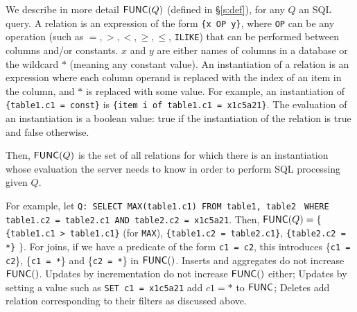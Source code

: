\appendix

We describe in more detail $\mathsf{FUNC}(Q)$ (defined in \S\ref{s:def}), for any $Q$
an SQL query. A relation is an expression of the form \texttt{\{x OP y\}}, where \texttt{OP} can be any
operation (such as $=, >, <, \ge, \le$, \texttt{ILIKE}) that can be performed
between columns and/or constants. $x$ and $y$ are either names of columns in
a database or the wildcard $*$ (meaning any constant value). An instantiation of a relation is an expression where each column operand is
replaced with the index of an item in the column, and $*$ is
replaced with some value. For example, an instantiation of \texttt{\{table1.c1 =
const\}} is \texttt{\{item i of table1.c1 = x1c5a21\}}. The evaluation of an
instantiation is a boolean value: true if the instantiation of the relation is
true and false otherwise.

Then, $\mathsf{FUNC}(Q)$ is the set of all relations for which there is an instantiation
whose evaluation the server needs to know in order to perform SQL processing
given $Q$.

For example, let \texttt{Q: SELECT MAX(table1.c1) FROM table1, table2} \texttt{
WHERE table1.c2 = table2.c1 AND table2.c2 = x1c5a21}. Then, $\mathsf{FUNC}(Q) = \{$
\texttt{\{table1.c1 > table1.c1\}} (for \texttt{MAX}), \texttt{\{table1.c2 =
table2.c1\}}, \texttt{\{table2.c2 = *\}} $\}$. For joins, if we have a
predicate of the form \texttt{c1 = c2}, this introduces \{\texttt{c1 = c2}\},
\{\texttt{c1 = *}\} and \{\texttt{c2 = *}\} in $\mathsf{FUNC}()$. Inserts and aggregates
do not increase $\mathsf{FUNC}()$. Updates by incrementation do not increase $\mathsf{FUNC}()$ either; Updates by setting a value such as \texttt{SET c1 = x1c5a21} add $c1 = *$ to $\mathsf{FUNC}{}$; Deletes add relation corresponding to their filters as discussed above.
